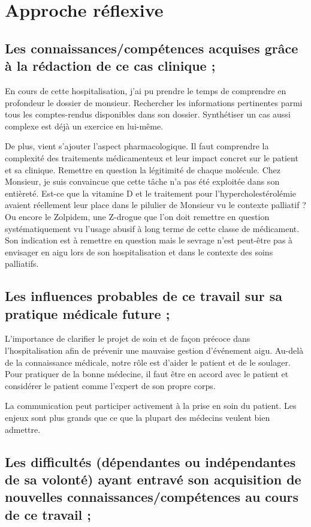 \section{Approche réflexive}

\subsection{Les connaissances/compétences acquises grâce à la rédaction de ce cas clinique ;} 

En cours de cette hospitalisation, j’ai pu prendre le temps de comprendre en profondeur le dossier de monsieur. Rechercher les informations pertinentes parmi tous les comptes-rendus disponibles dans son dossier. Synthétiser un cas aussi complexe est déjà un exercice en lui-même.

De plus, vient s’ajouter l’aspect pharmacologique. Il faut comprendre la complexité des traitements médicamenteux et leur impact concret sur le patient et sa clinique. Remettre en question la légitimité de chaque molécule. Chez Monsieur, je suis convaincue que cette tâche n’a pas été exploitée dans son entièreté. Est-ce que la vitamine D et le traitement pour l’hypercholestérolémie avaient réellement leur place dans le pilulier de Monsieur vu le contexte palliatif ? Ou encore le Zolpidem, une Z-drogue que l’on doit remettre en question systématiquement vu l’usage abusif à long terme de cette classe de médicament. Son indication est à remettre en question  mais le sevrage n’est peut-être pas à envisager en aigu lors de son hospitalisation et dans le contexte des soins palliatifs.

\subsection{Les influences probables de ce travail sur sa pratique médicale future ;}

L’importance de clarifier le projet de soin et de façon précoce dans l’hospitalisation afin de prévenir une mauvaise gestion d’événement aigu. Au-delà de la connaissance médicale, notre rôle est d’aider le patient et de le soulager. Pour pratiquer de la bonne médecine, il faut être en accord avec le patient et considérer le patient comme l’expert de son propre corps.

La communication peut participer activement à la prise en soin du patient. Les enjeux sont plus grands que ce que la plupart des médecins veulent bien admettre.

\subsection{Les difficultés (dépendantes ou indépendantes de sa volonté) ayant entravé son acquisition de nouvelles connaissances/compétences au cours de ce travail ;}


